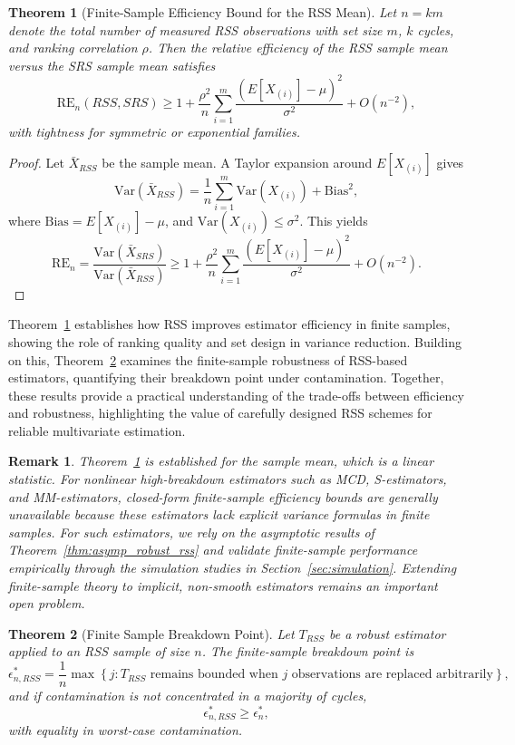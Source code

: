 \documentclass[12pt]{article}
\newtheorem{theorem}{Theorem}[section]
\newtheorem{remark}{Remark}[section]
\begin{document}
\begin{theorem}[Finite-Sample Efficiency Bound for the RSS Mean]
\label{thm:finite_eff}
Let $n = km$ denote the total number of measured RSS observations with set size $m$, $k$ cycles, and ranking correlation $\rho$. Then the relative efficiency of the RSS sample mean versus the SRS sample mean satisfies
\[
\text{RE}_n(RSS, SRS) \geq 1 + \frac{\rho^2}{n} \sum_{i=1}^{m} \frac{(E[X_{(i)}] - \mu)^2}{\sigma^2} + O(n^{-2}),
\]
with tightness for symmetric or exponential families.
\end{theorem}

\begin{proof}
Let $\bar{X}_{RSS}$ be the sample mean. A Taylor expansion around $E[X_{(i)}]$ gives
\[
\text{Var}(\bar{X}_{RSS}) = \frac{1}{n} \sum_{i=1}^{m} \text{Var}(X_{(i)}) + \text{Bias}^2,
\]
where $\text{Bias} = E[X_{(i)}] - \mu$, and $\text{Var}(X_{(i)}) \leq \sigma^2$. This yields
\[
\text{RE}_n = \frac{\text{Var}(\bar{X}_{SRS})}{\text{Var}(\bar{X}_{RSS})} \geq 1 + \frac{\rho^2}{n} \sum_{i=1}^{m} \frac{(E[X_{(i)}] - \mu)^2}{\sigma^2} + O(n^{-2}).
\]
\end{proof}
Theorem~\ref{thm:finite_eff} establishes how RSS improves estimator efficiency in finite samples, showing the role of ranking quality and set design in variance reduction. Building on this, Theorem~\ref{thm:finite_breakdown} examines the finite-sample robustness of RSS-based estimators, quantifying their breakdown point under contamination. Together, these results provide a practical understanding of the trade-offs between efficiency and robustness, highlighting the value of carefully designed RSS schemes for reliable multivariate estimation.

\begin{remark}
\label{rem:nonlinear_finite}
Theorem~\ref{thm:finite_eff} is established for the sample mean, which is a linear statistic. For nonlinear high-breakdown estimators such as MCD, S-estimators, and MM-estimators, closed-form finite-sample efficiency bounds are generally unavailable because these estimators lack explicit variance formulas in finite samples. For such estimators, we rely on the asymptotic results of Theorem~\ref{thm:asymp_robust_rss} and validate finite-sample performance empirically through the simulation studies in Section~\ref{sec:simulation}. Extending finite-sample theory to implicit, non-smooth estimators remains an important open problem.
\end{remark}

\begin{theorem}[Finite Sample Breakdown Point]
\label{thm:finite_breakdown}
Let $T_{RSS}$ be a robust estimator applied to an RSS sample of size $n$. The finite-sample breakdown point is
\[
\epsilon^*_{n,RSS} = \frac{1}{n} \max\left\{j : T_{RSS} \text{ remains bounded when } j \text{ observations are replaced arbitrarily} \right\},
\]
and if contamination is not concentrated in a majority of cycles,
\[
\epsilon^*_{n,RSS} \geq \epsilon^*_n,
\]
with equality in worst-case contamination.
\end{theorem}
\end{document}
